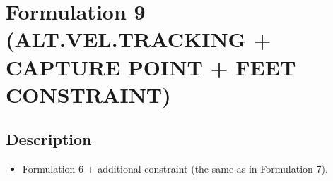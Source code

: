 \section{Formulation 9 (ALT.VEL.TRACKING + CAPTURE POINT + FEET CONSTRAINT)}\label{sec.form09}


\subsection{Description}
\begin{itemize}
    \item Formulation 6 + additional constraint (the same as in Formulation 7).
\end{itemize}


